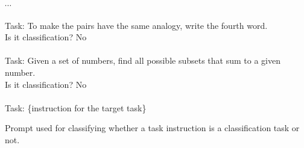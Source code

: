 \begin{table*}[]
{\begin{minipage}{\dimexpr\linewidth-2\fboxsep-2\fboxrule}
$\cdots$ \\
\\
Task: To make the pairs have the same analogy, write the fourth word.\\
Is it classification? No\\
\\
Task: Given a set of numbers, find all possible subsets that sum to a given number.\\
Is it classification? No\\
\\
Task: \{instruction for the target task\}
    \end{minipage}
}

    \caption{Prompt used for classifying whether a task instruction is a classification task or not.}
    \label{tab:classification_task_identification_template}
\end{table*}